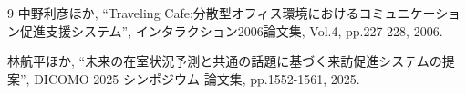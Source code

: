 \documentclass{jarticle}
\begin{document}



\begin{thebibliography}{9}
    中野利彦ほか,
    ``Traveling Cafe:分散型オフィス環境におけるコミュニケーション促進支援システム'',
    インタラクション2006論文集,
    Vol.4,
    pp.227-228,
    2006.

    林航平ほか,
    ``未来の在室状況予測と共通の話題に基づく来訪促進システムの提案'',
    DICOMO 2025 シンポジウム 論文集,
    pp.1552-1561,
    2025.

\end{thebibliography}
\end{document}
